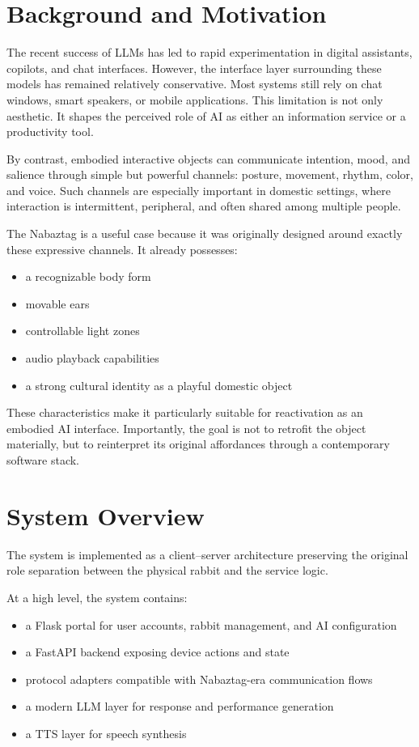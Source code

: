 \documentclass[11pt]{article}
\begin{document}
\section{Background and Motivation}

The recent success of LLMs has led to rapid experimentation in digital assistants, copilots, and chat interfaces. However, the interface layer surrounding these models has remained relatively conservative. Most systems still rely on chat windows, smart speakers, or mobile applications. This limitation is not only aesthetic. It shapes the perceived role of AI as either an information service or a productivity tool.

By contrast, embodied interactive objects can communicate intention, mood, and salience through simple but powerful channels: posture, movement, rhythm, color, and voice. Such channels are especially important in domestic settings, where interaction is intermittent, peripheral, and often shared among multiple people.

The Nabaztag is a useful case because it was originally designed around exactly these expressive channels. It already possesses:

\begin{itemize}[leftmargin=1.5em]
  \item a recognizable body form
  \item movable ears
  \item controllable light zones
  \item audio playback capabilities
  \item a strong cultural identity as a playful domestic object
\end{itemize}

These characteristics make it particularly suitable for reactivation as an embodied AI interface. Importantly, the goal is not to retrofit the object materially, but to reinterpret its original affordances through a contemporary software stack.

\section{System Overview}

The system is implemented as a client--server architecture preserving the original role separation between the physical rabbit and the service logic.

At a high level, the system contains:

\begin{itemize}[leftmargin=1.5em]
  \item a Flask portal for user accounts, rabbit management, and AI configuration
  \item a FastAPI backend exposing device actions and state
  \item protocol adapters compatible with Nabaztag-era communication flows
  \item a modern LLM layer for response and performance generation
  \item a TTS layer for speech synthesis
\end{itemize}
\end{document}
